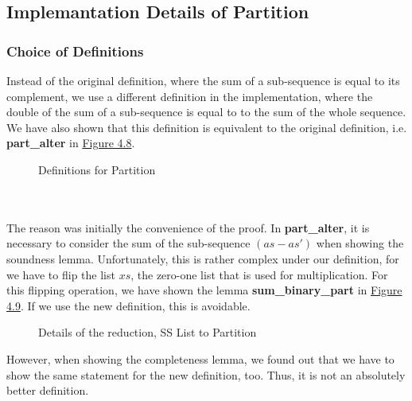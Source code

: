 \subsection{Implemantation Details of Partition}
\subsubsection{Choice of Definitions}
Instead of the original definition, where the sum of a sub-sequence is equal to its complement, we use a different definition in the implementation,
where the double of the sum of a sub-sequence is equal to to the sum of the whole sequence. We have also shown that this definition is equivalent 
to the original definition, i.e. \textbf{part\_alter} in \hyperref[fig:4.8]{Figure 4.8}. 
\begin{figure}[!h]
    \caption{Definitions for Partition}
    \label{fig:4.8}
\end{figure}\\\\
The reason was initially the convenience of the proof. 
In \textbf{part\_alter}, it is necessary to consider the sum of the sub-sequence $(as - as')$ when showing the soundness lemma. 
Unfortunately, this is rather complex under our definition, for we have to flip the list $xs$, the zero-one list that is used for multiplication. For this 
flipping operation, we have shown the lemma \textbf{sum\_binary\_part} in \hyperref[fig:4.9]{Figure 4.9}. If we use the new definition, this is avoidable.
\begin{figure}[!h]
    \caption{Details of the reduction, SS List to Partition}
    \label{fig:4.9}
\end{figure}
However, when showing the completeness lemma, we found out that we have to show the same statement for the new definition, too. 
Thus, it is not an absolutely better definition. 
